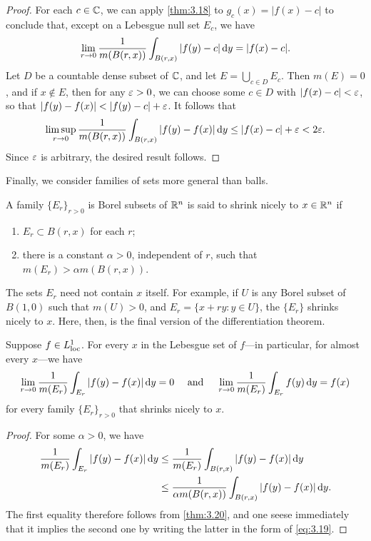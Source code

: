 \documentclass[12pt]{article} %
\begin{document}
\begin{proof}
    For each $c \in \mathbb{C}$, we can apply \cref{thm:3.18} to $g_c(x) = |f(x) - c|$ to conclude that, except on a Lebesgue null set $E_c$, we have \[\lim_{r \to 0} \frac{1}{m(B(r, x))} \int_{B(r, x)} |f(y) - c|\, \mathrm{d} y = |f(x) - c|.\] Let $D$ be a countable dense subset of $\mathbb{C}$, and let $E = \bigcup_{c \in D} E_c$. Then $m(E) = 0$, and if $x \notin E$, then for any $\varepsilon > 0$, we can choose some $c \in D$ with $|f(x) - c| < \varepsilon$, so that $|f(y) - f(x)| < |f(y) - c| + \varepsilon$. It follows that \[\limsup_{r \to 0} \frac{1}{m(B(r, x))} \int_{B(r, x)} |f(y) - f(x)| \, \mathrm{d} y \leq |f(x) - c| + \varepsilon < 2\varepsilon.\] Since $\varepsilon$ is arbitrary, the desired result follows.
\end{proof}

Finally, we consider families of sets more general than balls.

\begin{definition}
    A family $\{E_r\}_{r > 0}$ is Borel subsets of $\mathbb{R}^n$ is said to shrink nicely to $x \in \mathbb{R}^n$ if \begin{enumerate}
        \item $E_r \subset B(r, x)$ for each $r$;
        \item there is a constant $\alpha > 0$, independent of $r$, such that $m(E_r) > \alpha m(B(r, x))$.
    \end{enumerate}
\end{definition}

\noindent The sets $E_r$ need not contain $x$ itself. For example, if $U$ is any Borel subset of $B(1, 0)$ such that $m(U) > 0$, and $E_r = \{x + ry : y \in U\}$, the $\{E_r\}$ shrinks nicely to $x$. Here, then, is the final version of the differentiation theorem.

\begin{theorem}\label{thm:lebesgue-differentiation}
    Suppose $f \in L_{\operatorname{loc}}^1$. For every $x$ in the Lebesgue set of $f$---in particular, for almost every $x$---we have \[\lim_{r \to 0} \frac{1}{m(E_r)}\int_{E_r} |f(y) - f(x)| \d y = 0 \ \ \ \ \text{and} \ \ \ \ \lim_{r \to 0} \frac{1}{m(E_r)} \int_{E_r} f(y)\d y = f(x)\] for every family $\{E_r\}_{r > 0}$ that shrinks nicely to $x$.
\end{theorem}

\begin{proof}
    For some $\alpha > 0$, we have \begin{align*}
        \frac{1}{m(E_r)} \int_{E_r}|f(y) - f(x)|\, \mathrm{d} y &\leq \frac{1}{m(E_r)} \int_{B(r, x)} |f(y) - f(x)| \, \mathrm{d} y\\
        &\leq \frac{1}{\alpha m(B(r, x))} \int_{B(r, x)} |f(y) - f(x)| \, \mathrm{d} y.
    \end{align*} The first equality therefore follows from \cref{thm:3.20}, and one seese immediately that it implies the second one by writing the latter in the form of \cref{eq:3.19}.
\end{proof}
\end{document}
